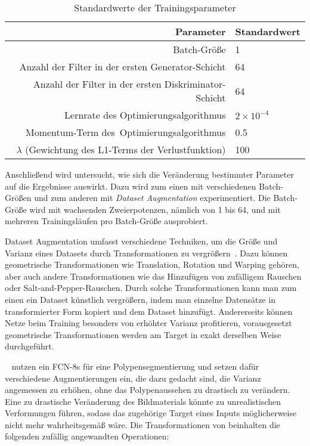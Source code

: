 \begin{table}
	\centering
	\caption{Standardwerte der Trainingsparameter}
	\label{tab:train_def_val}
	\begin{tabular}{rl} 
		\toprule
		Parameter                                            & Standardwert  \\ 
		\midrule
		Batch-Größe                                          & 1             \\
		Anzahl der Filter in der ersten Generator-Schicht    & 64            \\
		Anzahl der Filter in der ersten Diskriminator-Schicht    & 64            \\
		Lernrate des Optimierungsalgorithmus                 & $ 2 \times 10^{-4} $    \\
		Momentum-Term des~Optimierungsalgorithmus            & 0.5           \\
		$ \lambda $ (Gewichtung des L1-Terms der Verlustfunktion) & 100           \\
		\bottomrule
	\end{tabular}
\end{table}

Anschließend wird untersucht, wie sich die Veränderung bestimmter Parameter auf die Ergebnisse auswirkt.
Dazu wird zum einen mit verschiedenen Batch-Größen und zum anderen mit \emph{Dataset Augmentation} experimentiert.
Die Batch-Größe wird mit wachsenden Zweierpotenzen, nämlich von 1 bis 64, und mit mehreren Trainingsläufen pro Batch-Größe ausprobiert.

Dataset Augmentation umfasst verschiedene Techniken, um die Größe und Varianz eines Datasets durch Transformationen zu vergrößern~\cite{Goodfellow.2016}.
Dazu können geometrische Transformationen wie Translation, Rotation und Warping gehören, aber auch andere Transformationen wie das Hinzufügen von zufälligem Rauschen oder Salt-and-Pepper-Rauschen.
Durch solche Transformationen kann man zum einen ein Dataset künstlich vergrößern, indem man einzelne Datensätze in transformierter Form kopiert und dem Dataset hinzufügt.
Andererseits können Netze beim Training besonders von erhöhter Varianz profitieren, vorausgesetzt geometrische Transformationen werden am Target in exakt derselben Weise durchgeführt.

\citeauthor{Vazquez.2017}~\cite{Vazquez.2017} nutzen ein FCN-8s für eine Polypensegmentierung und setzen dafür verschiedene Augmentierungen ein, die dazu gedacht sind, die Varianz angemessen zu erhöhen, ohne das Polypenaussehen zu drastisch zu verändern.
Eine zu drastische Veränderung des Bildmaterials könnte zu unrealistischen Verformungen führen, sodass das zugehörige Target eines Inputs möglicherweise nicht mehr wahrheitsgemäß wäre.
Die Transformationen von \citeauthor{Vazquez.2017} beinhalten die folgenden zufällig angewandten Operationen:

